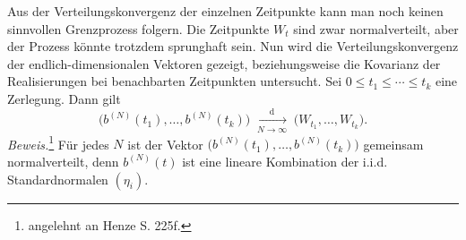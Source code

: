 \begin{satz}
Aus der Verteilungskonvergenz der einzelnen Zeitpunkte kann man noch keinen sinnvollen Grenzprozess folgern.
Die Zeitpunkte $W_t$ sind zwar normalverteilt, aber der Prozess könnte trotzdem sprunghaft sein.
Nun wird die Verteilungskonvergenz der endlich-dimensionalen Vektoren gezeigt, beziehungsweise
die Kovarianz der Realisierungen bei benachbarten Zeitpunkten untersucht.
Sei $0\le t_1\le\cdots\le t_k$ eine Zerlegung. Dann gilt
$$
\big(b^{(N)}(t_1), \dots , b^{(N)}(t_k) \big )\;\xrightarrow[N \to \infty]{\mathrm{d}}\;\big(W_{t_1},\dots,W_{t_k}\big).
$$
\textit{Beweis.}\footnote{angelehnt an Henze \cite{henze} S. 225f.}
Für jedes $N$ ist der Vektor $\big(b^{(N)}(t_1),\dots,b^{(N)}(t_k)\big)$ gemeinsam normalverteilt,
denn $b^{(N)}(t)$ ist eine lineare Kombination der i.i.d. Standardnormalen $(\eta_i)$.


\end{satz}
